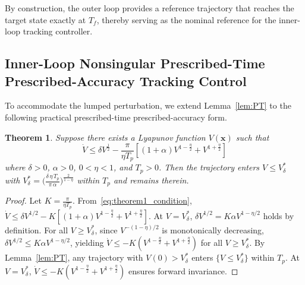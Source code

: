 \documentclass[journal]{new-aiaa}
\newtheorem{theorem}{Theorem}
\begin{document}
By construction, the outer loop provides a reference trajectory that reaches the target state exactly at $T_f$, thereby serving as the nominal reference for the inner-loop tracking controller.

\subsection{Inner-Loop Nonsingular Prescribed-Time Prescribed-Accuracy Tracking Control}
\label{sec:inner}

To accommodate the lumped perturbation, we extend Lemma~\ref{lem:PT} to the
following practical prescribed-time prescribed-accuracy form.

\begin{theorem}\label{thm:practical_PT}
Suppose there exists a Lyapunov function $V(\boldsymbol{x})$ such that
\begin{equation}
\dot V \le \delta V^{\tfrac{1}{2}} - \frac{\pi}{\eta T_p}\left[(1+\alpha) V^{1-\tfrac{\eta}{2}}+V^{1+\tfrac{\eta}{2}}\right]
\label{eq:theorem1_condition}
\end{equation}
where $\delta>0$, $\alpha>0$, $0<\eta<1$, and $T_p>0$. Then the trajectory enters
$V\le V^*_\delta$ with $V^*_\delta = \bigl(\frac{\delta\,\eta\,T_p}{\pi\,\alpha}\bigr)^{\frac{2}{1-\eta}}$
within $T_p$ and remains therein.
\end{theorem}

\begin{proof}
Let $K = \frac{\pi}{\eta T_p}$. From~\eqref{eq:theorem1_condition},
$\dot V \le \delta V^{1/2} - K[ (1+\alpha)V^{1-\frac{\eta}{2}} + V^{1+\frac{\eta}{2}} ]$.
At $V=V^*_\delta$, $\delta V^{1/2} = K\alpha V^{1-\eta/2}$ holds by definition.
For all $V\ge V^*_\delta$, since $V^{-(1-\eta)/2}$ is monotonically decreasing,
$\delta V^{1/2} \le K\alpha V^{1-\eta/2}$, yielding
$\dot V \le -K( V^{1-\frac{\eta}{2}} + V^{1+\frac{\eta}{2}} )$ for all $V\ge V^*_\delta$.
By Lemma~\ref{lem:PT}, any trajectory with $V(0)>V^*_\delta$ enters $\{V\le V^*_\delta\}$ within $T_p$.
At $V=V^*_\delta$, $\dot V\le -K(V^{1-\frac{\eta}{2}}+V^{1+\frac{\eta}{2}})$ ensures forward invariance.
\end{proof}
\end{document}
